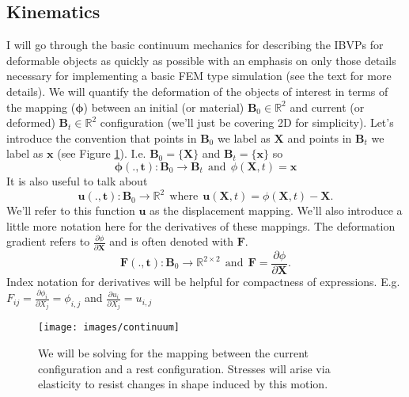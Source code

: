 \documentclass[article]{pcms-l}
\begin{document}
\subsection*{Kinematics}
I will go through the basic continuum mechanics for describing the IBVPs for deformable objects as quickly as possible with an emphasis on only those details necessary for implementing a basic FEM type simulation (see the text \cite{BW08} for more details). We will quantify the deformation of the objects of interest in terms of the mapping ($\mathbf{\phi}$) between an initial (or material) $\mathbf{B}_0\in\mathbb{R}^2$ and current (or deformed) $\mathbf{B}_t\in\mathbb{R}^2$ configuration (we'll just be covering 2D for simplicity). Let's introduce the convention that points in $\mathbf{B}_0$ we label as $\mathbf{X}$ and points in $\mathbf{B}_t$ we label as $\mathbf{x}$ (see Figure \ref{phi}). I.e. $\mathbf{B}_0=\{\mathbf{X}\}$ and $\mathbf{B}_t=\{\mathbf{x}\}$ so
$$
\mathbf{\phi(.,t)}:\mathbf{B}_0\rightarrow\mathbf{B}_t \ \ \textrm{and} \ \ \phi(\mathbf{X},t)=\mathbf{x}
$$
It is also useful to talk about
$$
\mathbf{u(.,t)}:\mathbf{B}_0\rightarrow\mathbb{R}^2\ \ \textrm{where} \ \ \mathbf{u}(\mathbf{X},t)=\phi(\mathbf{X},t)-\mathbf{X}.
$$
We'll refer to this function $\mathbf{u}$ as the displacement mapping. We'll also introduce a little more notation here for the derivatives of these mappings. The deformation gradient refers to $\frac{\partial\phi}{\partial\mathbf{X}}$ and is often denoted with $\mathbf{F}$.
$$
\mathbf{F(.,t)}:\mathbf{B}_0\rightarrow\mathbb{R}^{2\times2}\ \ \textrm{and} \ \ \mathbf{F}=\frac{\partial\phi}{\partial\mathbf{X}}.
$$
Index notation for derivatives will be helpful for compactness of expressions. E.g. $F_{ij}=\frac{\partial\phi_i}{\partial{X}_j}=\phi_{i,j}$ and $\frac{\partial{u}_i}{\partial{X}_j}=u_{i,j}$
\begin{figure}
\texttt{[image: images/continuum]}
\caption{We will be solving for the mapping between the current configuration and a rest configuration. Stresses will arise via elasticity to resist changes in shape induced by this motion.}
\label{phi}
\end{figure}
\end{document}
